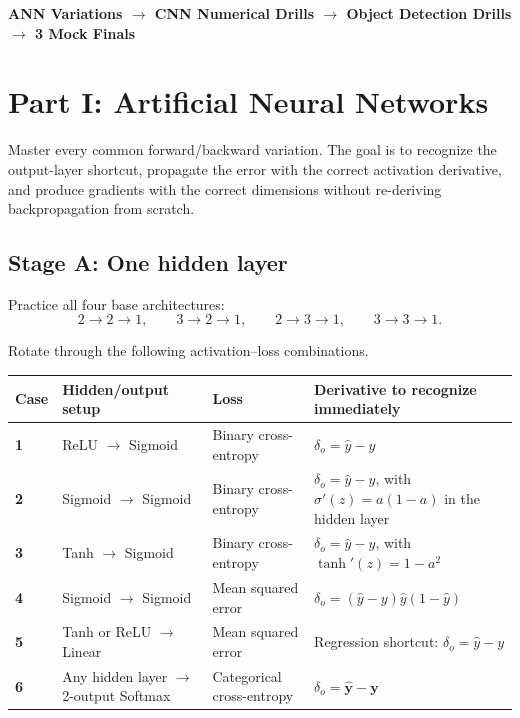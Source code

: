 \documentclass[11pt]{article}
\begin{document}
\begin{focusbox}
\begin{center}
\large\bfseries\color{PlanNavy}
ANN Variations
\(\boldsymbol{\longrightarrow}\)
CNN Numerical Drills
\(\boldsymbol{\longrightarrow}\)
Object Detection Drills
\(\boldsymbol{\longrightarrow}\)
3 Mock Finals
\end{center}
\end{focusbox}

\section{Part I: Artificial Neural Networks}

\begin{focusbox}[Objective]
Master every common forward/backward variation. The goal is to recognize the output-layer shortcut, propagate the error with the correct activation derivative, and produce gradients with the correct dimensions without re-deriving backpropagation from scratch.
\end{focusbox}

\subsection{Stage A: One hidden layer}

Practice all four base architectures:
\[
2\!\to\!2\!\to\!1,\qquad
3\!\to\!2\!\to\!1,\qquad
2\!\to\!3\!\to\!1,\qquad
3\!\to\!3\!\to\!1.
\]

Rotate through the following activation--loss combinations.

\begin{center}
\small
\begin{tabularx}{\textwidth}{>{\bfseries}p{0.82cm} p{3.3cm} p{3.08cm} X}
\toprule
Case & Hidden/output setup & Loss & Derivative to recognize immediately \\
\midrule
1 & ReLU \(\to\) Sigmoid & Binary cross-entropy & \(\delta_o=\hat y-y\) \\
2 & Sigmoid \(\to\) Sigmoid & Binary cross-entropy & \(\delta_o=\hat y-y\), with \(\sigma'(z)=a(1-a)\) in the hidden layer \\
3 & Tanh \(\to\) Sigmoid & Binary cross-entropy & \(\delta_o=\hat y-y\), with \(\tanh'(z)=1-a^2\) \\
4 & Sigmoid \(\to\) Sigmoid & Mean squared error & \(\delta_o=(\hat y-y)\hat y(1-\hat y)\) \\
5 & Tanh or ReLU \(\to\) Linear & Mean squared error & Regression shortcut: \(\delta_o=\hat y-y\) \\
6 & Any hidden layer \(\to\) 2-output Softmax & Categorical cross-entropy & \(\delta_o=\hat{\boldsymbol y}-\boldsymbol y\) \\
\bottomrule
\end{tabularx}
\end{center}
\end{document}

